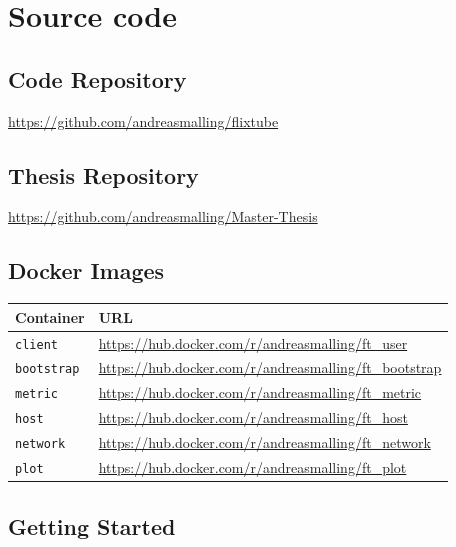 \chapter{Source code}
\label{app:code}

\section{Code Repository}
\label{app:code_repo}

\url{https://github.com/andreasmalling/flixtube}

\section{Thesis Repository}
\label{app:thesis_repo}

\url{https://github.com/andreasmalling/Master-Thesis}

\section{Docker Images}
\begin{table}[ht]
\centering
    \begin{tabular}{ll}
        \toprule 
        Container           & URL                                                       \\
        \midrule
        \texttt{client}     & \url{https://hub.docker.com/r/andreasmalling/ft_user}     \\
        \texttt{bootstrap}  & \url{https://hub.docker.com/r/andreasmalling/ft_bootstrap}\\
        \texttt{metric}     & \url{https://hub.docker.com/r/andreasmalling/ft_metric}   \\
        \texttt{host}       & \url{https://hub.docker.com/r/andreasmalling/ft_host}     \\
        \texttt{network}    & \url{https://hub.docker.com/r/andreasmalling/ft_network}  \\
        \texttt{plot}       & \url{https://hub.docker.com/r/andreasmalling/ft_plot}     \\
        \bottomrule
    \end{tabular}
\end{table}

\section{Getting Started}
\label{app:getting_started}

